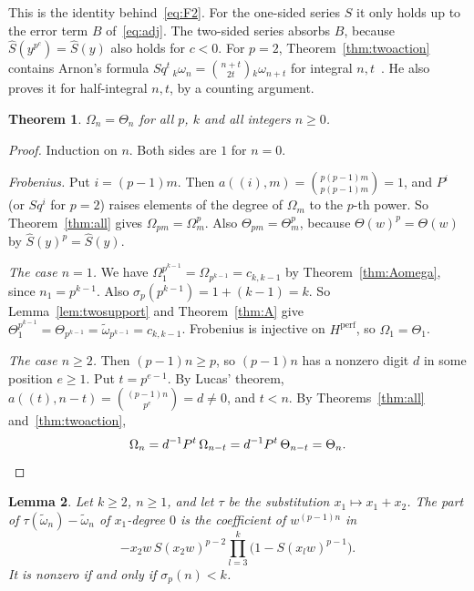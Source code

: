 \documentclass[11pt]{amsart}
\newtheorem{theorem}{Theorem}[section]
\newtheorem{lemma}[theorem]{Lemma}
\theoremstyle{definition}
\theoremstyle{remark}
\newcommand{\wt}{\widetilde{\omega}}
\begin{document}
This is the identity behind~\eqref{eq:F2}.  For the one-sided series $S$ it
only holds up to the error term $B$ of~\eqref{eq:adj}.  The two-sided series
absorbs $B$, because $\widehat S(y^{p^c})=\widehat S(y)$ also holds for
$c<0$.  For $p=2$, Theorem~\ref{thm:twoaction} contains Arnon's
formula $Sq^t\,{}_k\omega_n=\binom{n+t}{2t}{}_k\omega_{n+t}$ for integral
$n,t$~\cite[Thm.~3.9]{Arnon}.  He also proves it for half-integral $n,t$, by a
counting argument.

\begin{theorem}\label{thm:arnon}
$\Omega_n=\Theta_n$ for all $p$, $k$ and all integers $n\ge0$.
\end{theorem}

\begin{proof}
Induction on $n$.  Both sides are $1$ for $n=0$.

\emph{Frobenius.}  Put $i=(p-1)m$.  Then $a((i),m)=\binom{p(p-1)m}{p(p-1)m}=1$,
and $P^i$ (or $Sq^i$ for $p=2$) raises elements of the degree of $\Omega_m$ to
the $p$-th power.  So Theorem~\ref{thm:all} gives $\Omega_{pm}=\Omega_m^p$.
Also $\Theta_{pm}=\Theta_m^p$, because $\Theta(w)^p=\Theta(w)$ by
$\widehat S(y)^p=\widehat S(y)$.

\emph{The case $n=1$.}  We have
$\Omega_1^{p^{k-1}}=\Omega_{p^{k-1}}=c_{k,k-1}$ by Theorem~\ref{thm:Aomega},
since $n_1=p^{k-1}$.  Also $\sigma_p(p^{k-1})=1+(k-1)=k$.  So
Lemma~\ref{lem:twosupport} and Theorem~\ref{thm:A} give
$\Theta_1^{p^{k-1}}=\Theta_{p^{k-1}}=\wt_{p^{k-1}}=c_{k,k-1}$.  Frobenius is
injective on $H^{\mathrm{perf}}$, so $\Omega_1=\Theta_1$.

\emph{The case $n\ge2$.}  Then $(p-1)n\ge p$, so $(p-1)n$ has a nonzero digit
$d$ in some position $e\ge1$.  Put $t=p^{e-1}$.  By Lucas' theorem,
$a((t),n-t)=\binom{(p-1)n}{p^e}=d\ne0$, and $t<n$.  By
Theorems~\ref{thm:all} and~\ref{thm:twoaction},
\[
  \Omega_n=d^{-1}P^t\,\Omega_{n-t}=d^{-1}P^t\,\Theta_{n-t}=\Theta_n. \qedhere
\]
\end{proof}

\begin{lemma}\label{lem:transvection}
Let $k\ge2$, $n\ge1$, and let $\tau$ be the substitution $x_1\mapsto x_1+x_2$.
The part of $\tau(\wt_n)-\wt_n$ of $x_1$-degree $0$ is the coefficient of
$w^{(p-1)n}$ in
\[
  -x_2w\,S(x_2w)^{p-2}\prod_{l=3}^k\bigl(1-S(x_lw)^{p-1}\bigr).
\]
It is nonzero if and only if $\sigma_p(n)<k$.
\end{lemma}
\end{document}
